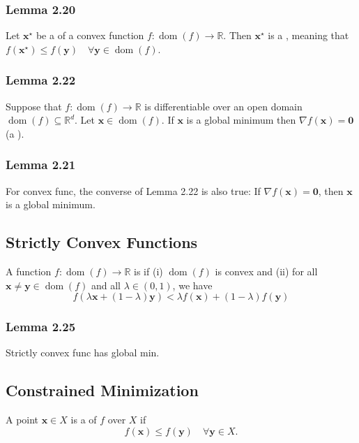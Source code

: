 \subsubsection*{Lemma 2.20}
Let $\mathbf{x}^{\star}$ be a  of a convex function $f: \operatorname{dom}(f) \rightarrow \mathbb{R}$. Then $\mathbf{x}^{\star}$ is a , meaning that $f\left(\mathbf{x}^{\star}\right) \leq f(\mathbf{y}) \quad \forall \mathbf{y} \in \operatorname{dom}(f)$.

\subsubsection*{Lemma 2.22}
Suppose that $f: \operatorname{dom}(f) \rightarrow \mathbb{R}$ is differentiable over an open domain $\operatorname{dom}(f) \subseteq \mathbb{R}^{d}$. Let $\mathbf{x} \in \operatorname{dom}(f)$. If $\mathbf{x}$ is a global minimum then $\nabla f(\mathbf{x})=\mathbf{0}$ (a ).

\subsubsection*{Lemma 2.21}
For convex func, the converse of Lemma 2.22 is also true: If $\nabla f(\mathbf{x})=\mathbf{0}$, then $\mathbf{x}$ is a global minimum.

\subsection*{Strictly Convex Functions}
A function $f: \operatorname{dom}(f) \rightarrow \mathbb{R}$ is  if (i) $\operatorname{dom}(f)$ is convex and (ii) for all $\mathbf{x} \neq \mathbf{y} \in \operatorname{dom}(f)$ and all $\lambda \in(0,1)$, we have
$$
f(\lambda \mathbf{x}+(1-\lambda) \mathbf{y})<\lambda f(\mathbf{x})+(1-\lambda) f(\mathbf{y})
$$

\subsubsection*{Lemma 2.25}
Strictly convex func has  global min.

\subsection*{Constrained Minimization}
A point $\mathbf{x} \in X$ is a  of $f$ over $X$ if
$$
f(\mathbf{x}) \leq f(\mathbf{y}) \quad \forall \mathbf{y} \in X .
$$
